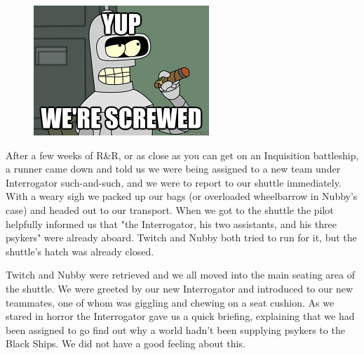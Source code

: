 \begin{figure}
	\begin{center}
		\includegraphics[width=\figwidth]{pics/2/19.png}
	\end{center}
\end{figure}
After a few weeks of R\&R, or as close as you can get on an Inquisition battleship, a runner came down and told us we were being assigned to a new team under Interrogator such-and-such, and we were to report to our shuttle immediately. 
With a weary sigh we packed up our bags (or overloaded wheelbarrow in Nubby's case) and headed out to our transport. 
When we got to the shuttle the pilot helpfully informed us that "the Interrogator, his two assistants, and his three psykers" were already aboard. 
Twitch and Nubby both tried to run for it, but the shuttle's hatch was already closed.

Twitch and Nubby were retrieved and we all moved into the main seating area of the shuttle. 
We were greeted by our new Interrogator and introduced to our new teammates, one of whom was giggling and chewing on a seat cushion. 
As we stared in horror the Interrogator gave us a quick briefing, explaining that we had been assigned to go find out why a world hadn't been supplying psykers to the Black Ships. 
We did not have a good feeling about this.






